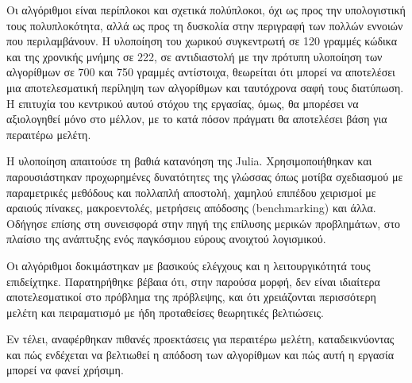	Οι αλγόριθμοι είναι περίπλοκοι και σχετικά πολύπλοκοι, όχι ως προς την υπολογιστική τους πολυπλοκότητα,
	αλλά ως προς τη δυσκολία στην περιγραφή των πολλών εννοιών που περιλαμβάνουν.
	Η υλοποίηση του χωρικού συγκεντρωτή σε 120 γραμμές κώδικα και της χρονικής μνήμης σε 222,
	σε αντιδιαστολή με την πρότυπη υλοποίηση των αλγορίθμων σε 700 και 750 γραμμές αντίστοιχα,
	θεωρείται ότι μπορεί να αποτελέσει μια αποτελεσματική περίληψη των αλγορίθμων και ταυτόχρονα σαφή τους διατύπωση.
	Η επιτυχία του κεντρικού αυτού στόχου της εργασίας, όμως, θα μπορέσει να αξιολογηθεί μόνο στο μέλλον, με το κατά πόσον πράγματι θα αποτελέσει βάση για περαιτέρω μελέτη.

	Η υλοποίηση απαιτούσε τη βαθιά κατανόηση της Julia.
	Χρησιμοποιήθηκαν και παρουσιάστηκαν προχωρημένες δυνατότητες της γλώσσας όπως μοτίβα σχεδιασμού με παραμετρικές μεθόδους και πολλαπλή αποστολή,
	χαμηλού επιπέδου χειρισμοί με αραιούς πίνακες, μακροεντολές, μετρήσεις απόδοσης (benchmarking) και άλλα.
	Οδήγησε επίσης στη συνεισφορά στην πηγή της επίλυσης μερικών προβλημάτων, στο πλαίσιο της ανάπτυξης ενός παγκόσμιου εύρους ανοιχτού λογισμικού.

	Οι αλγόριθμοι δοκιμάστηκαν με βασικούς ελέγχους και η λειτουργικότητά τους επιδείχτηκε.
	Παρατηρήθηκε βέβαια ότι, στην παρούσα μορφή, δεν είναι ιδιαίτερα αποτελεσματικοί στο πρόβλημα της πρόβλεψης,
	και ότι χρειάζονται περισσότερη μελέτη και πειραματισμό με ήδη προταθείσες θεωρητικές βελτιώσεις.

	Εν τέλει, αναφέρθηκαν πιθανές προεκτάσεις για περαιτέρω μελέτη, καταδεικνύοντας και πώς ενδέχεται να βελτιωθεί η απόδοση των αλγορίθμων
	και πώς αυτή η εργασία μπορεί να φανεί χρήσιμη.

